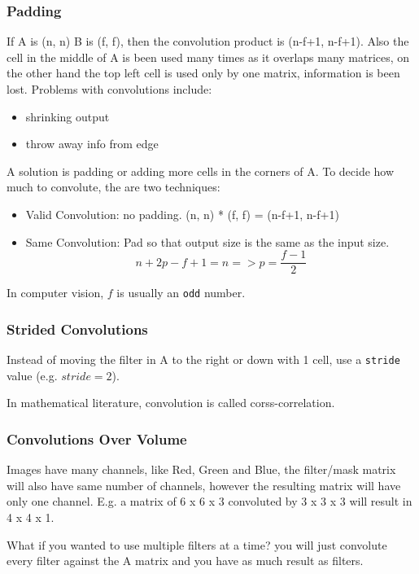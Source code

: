 \subsubsection{Padding}
If A is (n, n) B is (f, f), then the convolution product is (n-f+1, n-f+1). Also the cell in the middle of A is been used many times as it overlaps many matrices, on the other hand the top left cell is used only by one matrix, information is been lost. Problems with convolutions include:
\begin{itemize}
    \item shrinking output
    \item throw away info from edge
\end{itemize}
A solution is padding or adding more cells in the corners of A. To decide how much to convolute, the are two techniques:
\begin{itemize}
    \item Valid Convolution: no padding. (n, n) * (f, f) = (n-f+1, n-f+1)
    \item Same Convolution: Pad so that output size is the same as the input size.
    \begin{equation}
        n+2p-f+1 = n => p = \frac{f - 1}{2}
    \end{equation}
\end{itemize}
In computer vision, $f$ is usually an \texttt{odd} number.

\subsubsection{Strided Convolutions}
Instead of moving the filter in A to the right or down with 1 cell, use a \texttt{stride} value (e.g. $stride = 2$).

In mathematical literature, convolution is called corss-correlation.

\subsubsection{Convolutions Over Volume}
Images have many channels, like Red, Green and Blue, the filter/mask matrix will also have same number of channels, however the resulting matrix will have only one channel.
E.g. a matrix of 6 x 6 x 3 convoluted by 3 x 3 x 3 will result in 4 x 4 x 1.

What if you wanted to use multiple filters at a time? you will just convolute every filter against the A matrix and you have as much result as filters.

